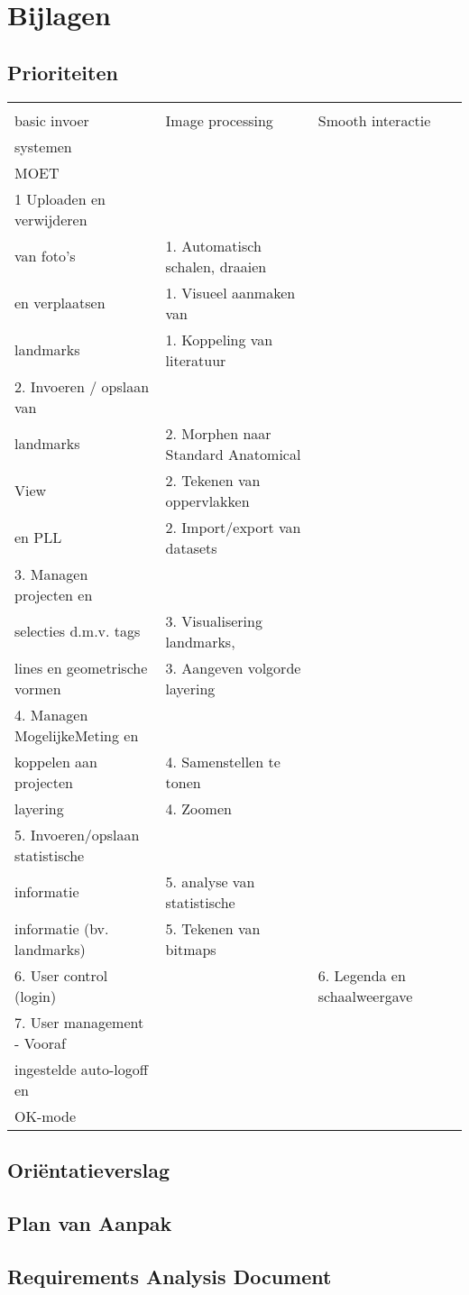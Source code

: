 \section{Bijlagen}
\label{Bijlagen}
\subsection{Prioriteiten}
\begin{table*}[htbp]
	\caption{Prioriteiten}
	\label{tab:Prioriteiten}
	\begin{tabular}{llll}
		\large{Database systeem en \\basic invoer} & \large{Image processing} & \large{Smooth interactie} & \large{Koppeling met andere \\systemen} \\
		\large{MOET} & & & \\
		1 Uploaden en verwijderen \\van foto's & 1. Automatisch schalen, draaien \\en verplaatsen & 1. Visueel aanmaken van \\landmarks & 1. Koppeling van literatuur \\
		2. Invoeren / opslaan van \\landmarks & 2. Morphen naar Standard Anatomical \\View & 2. Tekenen van oppervlakken \\en PLL & 2. Import/export van datasets \\
		3. Managen projecten en \\selecties d.m.v. tags & 3. Visualisering landmarks, \\lines en geometrische vormen & 3. Aangeven volgorde layering & \\
		4. Managen MogelijkeMeting en \\koppelen aan projecten & 4. Samenstellen te tonen \\layering & 4. Zoomen & \\
		5. Invoeren/opslaan statistische \\informatie & 5. analyse van statistische \\informatie (bv. landmarks) & 5. Tekenen van bitmaps & \\
		6. User control (login) & & 6. Legenda en schaalweergave & \\
		7. User management - Vooraf \\ingestelde auto-logoff en \\OK-mode & & & \\
	\end{tabular}
\end{table*}

\subsection{Ori\"{e}ntatieverslag}

\subsection{Plan van Aanpak}

\subsection{Requirements Analysis Document}

